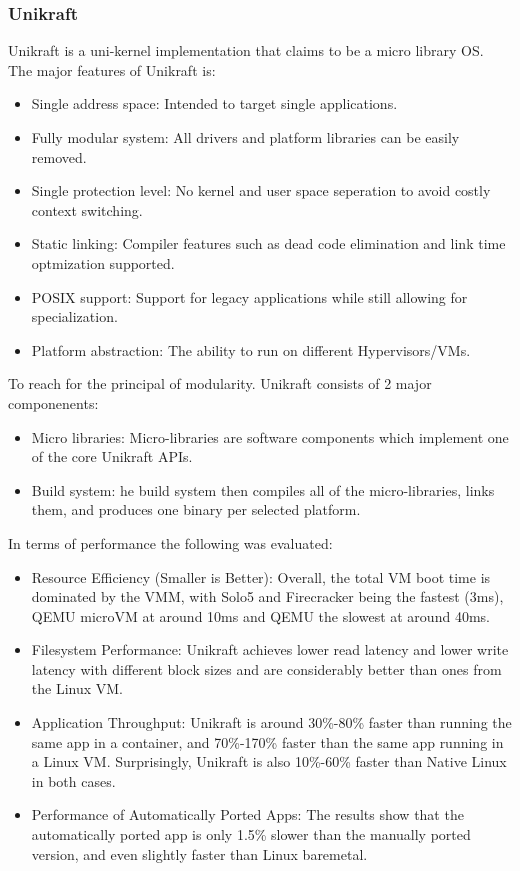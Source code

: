 \subsubsection{Unikraft}
Unikraft is a uni-kernel implementation that claims to be 
a micro library OS. The major features of Unikraft is:
\begin{itemize}
  \item Single address space: Intended to target single applications.
  \item Fully modular system: All drivers and platform libraries can be easily removed.
  \item Single protection level: No kernel and user space seperation to avoid costly context switching.
  \item Static linking: Compiler features such as dead code elimination and link time optmization supported. 
  \item POSIX support: Support for legacy applications while still allowing for specialization. 
  \item Platform abstraction: The ability to run on different Hypervisors/VMs. 
\end{itemize}
To reach for the principal of modularity. Unikraft consists of 2 major componenents: 
\begin{itemize}
  \item Micro libraries: Micro-libraries are software components 
  which implement one of the core Unikraft APIs.
  \item Build system: he build system
  then compiles all of the micro-libraries, links them,
  and produces one binary per selected platform.
\end{itemize}
In terms of performance the following was evaluated: 
\begin{itemize}
  \item Resource Efficiency (Smaller is Better): Overall, the total VM boot time is dominated by the VMM,
  with Solo5 and Firecracker being the fastest (3ms), QEMU
  microVM at around 10ms and QEMU the slowest at around
  40ms.
  \item Filesystem Performance: Unikraft
  achieves lower read latency and lower write latency with
  different block sizes and are considerably better than ones
  from the Linux VM.
  \item Application Throughput: Unikraft is around 30\%-80\% faster than running the same app
  in a container, and 70\%-170\% faster than the same app running 
  in a Linux VM. Surprisingly, Unikraft is also 10\%-60\%
  faster than Native Linux in both cases.
  \item Performance of Automatically Ported Apps: The results
  show that the automatically ported app is only 1.5\% slower
  than the manually ported version, and even slightly faster
  than Linux baremetal.
\end{itemize}

